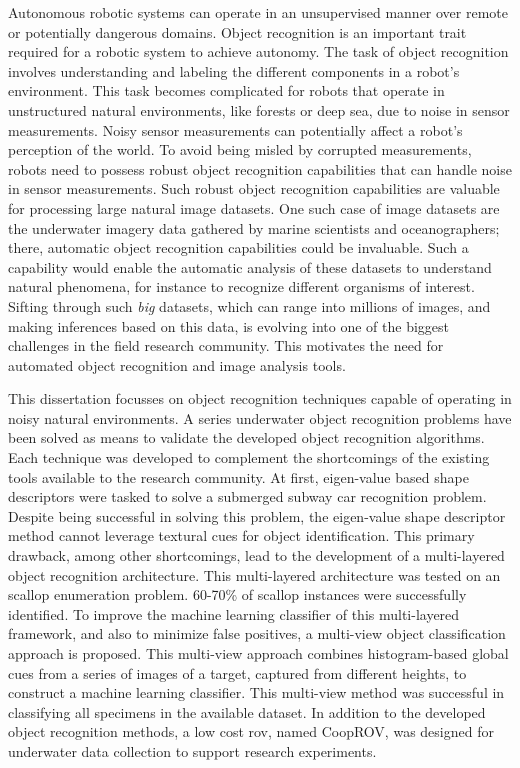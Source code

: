 Autonomous robotic systems can operate in an unsupervised manner over remote or potentially dangerous domains.
Object recognition is an important trait required for a robotic system to achieve autonomy.
The task of object recognition involves understanding and labeling the different components in a robot's environment. This task becomes complicated for robots that operate in unstructured natural environments, like forests or deep sea, due to noise in sensor measurements. Noisy sensor measurements can potentially affect a robot's perception of the world. To avoid being misled by corrupted measurements, robots need to possess robust object recognition capabilities that can handle noise in sensor measurements. Such robust object recognition capabilities are valuable for processing large natural image datasets. One such case of image datasets are the underwater imagery data gathered by marine scientists and oceanographers; there, automatic object recognition capabilities could be invaluable. Such a capability would enable the automatic analysis of these datasets to understand natural phenomena, for instance to recognize different organisms of interest. Sifting through such \emph{big} datasets, which can range into millions of images, and making inferences based on this data, is evolving into one of the biggest challenges in the field research community. This motivates the need for automated object recognition and image analysis tools.

This dissertation focusses on object recognition techniques capable of operating in noisy natural environments.
A series underwater object recognition  problems have been solved as means to validate the developed object recognition algorithms. 
Each technique was developed to complement the shortcomings of the existing tools available to the research community. 
At first, eigen-value based shape descriptors were tasked to solve a submerged subway car recognition problem. Despite being successful in solving this problem, the eigen-value shape descriptor method cannot leverage textural cues for object identification. This primary drawback, among other shortcomings, lead to the development of a multi-layered object recognition architecture. This multi-layered architecture was tested on an scallop enumeration problem. 60-70\% of scallop instances were successfully identified. To improve the machine learning classifier of this multi-layered framework, and also to minimize false positives, a multi-view object classification approach is proposed. This multi-view approach combines histogram-based global cues from a series of images of a target, captured from different heights, to construct a machine learning classifier. This multi-view method was successful in classifying all specimens in the available dataset. In addition to the developed object recognition methods, a low cost \gls{rov}, 
named CoopROV, was designed for underwater data collection to support research experiments.
